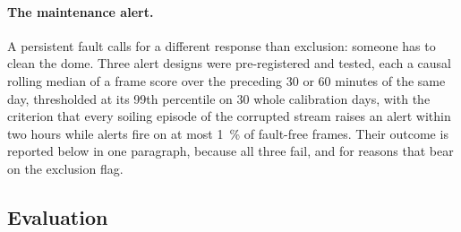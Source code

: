 \paragraph{The maintenance alert.} A persistent fault calls for a different response than exclusion: someone has to clean the dome. Three alert designs were pre-registered and tested, each a causal rolling median of a frame score over the preceding 30 or 60 minutes of the same day, thresholded at its 99th percentile on 30 whole calibration days, with the criterion that every soiling episode of the corrupted stream raises an alert within two hours while alerts fire on at most \SI{1}{\percent} of fault-free frames. Their outcome is reported below in one paragraph, because all three fail, and for reasons that bear on the exclusion flag.

\subsection{Evaluation}
\label{sec:ch4-admissibility-evaluation}

